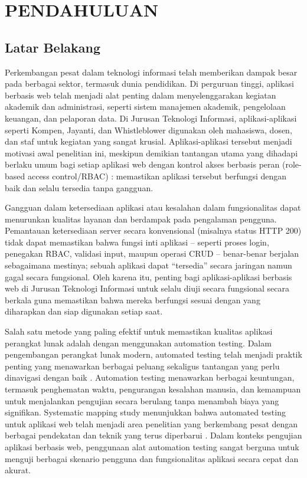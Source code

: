 \chapter{PENDAHULUAN}\label{bab-i-pendahuluan}

\section{Latar Belakang}\label{latar-belakang}

Perkembangan pesat dalam teknologi informasi telah memberikan dampak besar pada berbagai sektor, termasuk dunia pendidikan. Di perguruan tinggi, aplikasi berbasis web telah menjadi alat penting dalam menyelenggarakan kegiatan akademik dan administrasi, seperti sistem manajemen akademik, pengelolaan keuangan, dan pelaporan data. Di Jurusan Teknologi Informasi, aplikasi-aplikasi seperti Kompen, Jayanti, dan Whistleblower digunakan oleh mahasiswa, dosen, dan staf untuk kegiatan yang sangat krusial. Aplikasi-aplikasi tersebut menjadi motivasi awal penelitian ini, meskipun demikian tantangan utama yang dihadapi berlaku umum bagi setiap aplikasi web dengan kontrol akses berbasis peran (role-based access control/RBAC) \parencite{sandhu1996rbac}: memastikan aplikasi tersebut berfungsi dengan baik dan selalu tersedia tanpa gangguan.

Gangguan dalam ketersediaan aplikasi atau kesalahan dalam fungsionalitas dapat menurunkan kualitas layanan dan berdampak pada pengalaman pengguna. Pemantauan ketersediaan server secara konvensional (misalnya status HTTP 200) tidak dapat memastikan bahwa fungsi inti aplikasi -- seperti proses login, penegakan RBAC, validasi input, maupun operasi CRUD -- benar-benar berjalan sebagaimana mestinya; sebuah aplikasi dapat ``tersedia'' secara jaringan namun gagal secara fungsional. Oleh karena itu, penting bagi aplikasi-aplikasi berbasis web di Jurusan Teknologi Informasi untuk selalu diuji secara fungsional secara berkala guna memastikan bahwa mereka berfungsi sesuai dengan yang diharapkan dan siap digunakan setiap saat.

Salah satu metode yang paling efektif untuk memastikan kualitas aplikasi perangkat lunak adalah dengan menggunakan automation testing. Dalam pengembangan perangkat lunak modern, automated testing telah menjadi praktik penting yang menawarkan berbagai peluang sekaligus tantangan yang perlu dinavigasi dengan baik \parencite{solige2025automation}. Automation testing menawarkan berbagai keuntungan, termasuk penghematan waktu, pengurangan kesalahan manusia, dan kemampuan untuk menjalankan pengujian secara berulang tanpa menambah biaya yang signifikan. Systematic mapping study menunjukkan bahwa automated testing untuk aplikasi web telah menjadi area penelitian yang berkembang pesat dengan berbagai pendekatan dan teknik yang terus diperbarui \parencite{wang2023}. Dalam konteks pengujian aplikasi berbasis web, penggunaan alat automation testing sangat berguna untuk menguji berbagai skenario pengguna dan fungsionalitas aplikasi secara cepat dan akurat.

